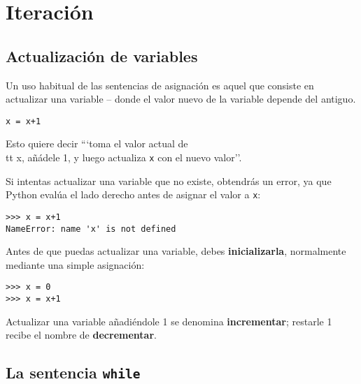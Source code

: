 
\chapter{Iteración}

\section{Actualización de variables}
\label{update}


Un uso habitual de las sentencias de asignación es aquel que consiste en
actualizar una variable --
donde el valor nuevo de la variable depende del antiguo.

\beforeverb
\begin{verbatim}
x = x+1
\end{verbatim}
\afterverb
%
Esto quiere decir ```toma el valor actual de {\\tt x}, añádele 1, y luego
actualiza {\tt x} con el nuevo valor''.

Si intentas actualizar una variable que no existe, obtendrás
un error, ya que Python evalúa el lado derecho antes de asignar
el valor a {\tt x}:

\beforeverb
\begin{verbatim}
>>> x = x+1
NameError: name 'x' is not defined
\end{verbatim}
\afterverb
%
Antes de que puedas actualizar una variable, debes {\bf inicializarla},
normalmente mediante una simple asignación:


\beforeverb
\begin{verbatim}
>>> x = 0
>>> x = x+1
\end{verbatim}
\afterverb
%
Actualizar una variable añadiéndole 1 se denomina {\bf incrementar};
restarle 1 recibe el nombre de {\bf decrementar}.


\section{La sentencia {\tt while}}


